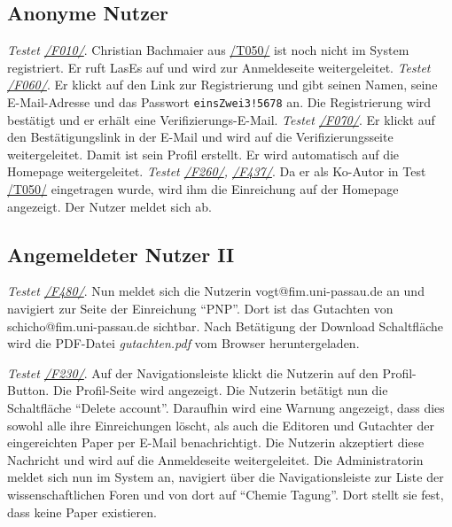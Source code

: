 \subsection{Anonyme Nutzer}

\begin{description}
	 \emph{Testet \hyperref[funkt:010]{/F010/}}.
	Christian Bachmaier aus \hyperref[t050]{/T050/} ist noch nicht im System registriert.
	Er ruft LasEs auf und wird zur Anmeldeseite weitergeleitet.
	 \emph{Testet \hyperref[funkt:060]{/F060/}}.
	Er klickt auf den Link zur Registrierung und gibt seinen Namen, seine E-Mail-Adresse und das Passwort \texttt{einsZwei3!5678} an.
	Die Registrierung wird bestätigt und er erhält eine Verifizierungs-E-Mail.
	 \emph{Testet \hyperref[funkt:070]{/F070/}}.
	Er klickt auf den Bestätigungslink in der E-Mail und wird auf die Verifizierungsseite weitergeleitet.
	Damit ist sein Profil erstellt.
	Er wird automatisch auf die Homepage weitergeleitet.
	 \emph{Testet \hyperref[funkt:260]{/F260/}, \hyperref[funkt:437]{/F437/}}.
	Da er als Ko-Autor in Test \hyperref[t050]{/T050/} eingetragen wurde, wird ihm die Einreichung auf der Homepage angezeigt.
	Der Nutzer meldet sich ab.
\end{description}

\subsection{Angemeldeter Nutzer II}

\begin{description}

	 \emph{Testet \hyperref[funkt:480]{/F480/}}.
	Nun meldet sich die Nutzerin vogt@fim.uni-passau.de an und navigiert zur Seite der Einreichung ``P\neq NP''.
	Dort ist das Gutachten von schicho@fim.uni-passau.de sichtbar.
	Nach Betätigung der Download Schaltfläche wird die PDF-Datei \emph{gutachten.pdf} vom Browser heruntergeladen.

	 \emph{Testet \hyperref[funkt:230]{/F230/}}.
	Auf der Navigationsleiste klickt die Nutzerin auf den Profil-Button.
	Die Profil-Seite wird angezeigt.
	Die Nutzerin betätigt nun die Schaltfläche ``Delete account''.
	Daraufhin wird eine Warnung angezeigt, dass dies sowohl alle ihre Einreichungen löscht, als auch die Editoren und Gutachter der eingereichten Paper per E-Mail benachrichtigt.
	Die Nutzerin akzeptiert diese Nachricht und wird auf die Anmeldeseite weitergeleitet.
	Die Administratorin meldet sich nun im System an, navigiert über die Navigationsleiste zur Liste der wissenschaftlichen Foren und von dort auf ``Chemie Tagung''.
	Dort stellt sie fest, dass keine Paper existieren.

\end{description}

